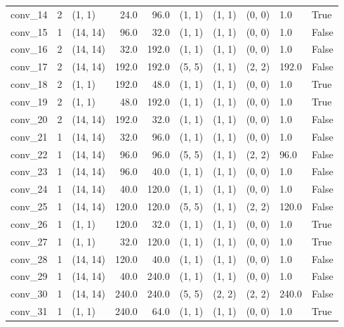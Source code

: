 \begin{center}
\begin{table}[]
\begin{tabular}{lrlrrlllll}
        conv\_14 &      2 &      (1, 1) &   24.0 &    96.0 &  (1, 1) &  (1, 1) &  (0, 0) &    1.0 &   True \\
        conv\_15 &      1 &    (14, 14) &   96.0 &    32.0 &  (1, 1) &  (1, 1) &  (0, 0) &    1.0 &  False \\
        conv\_16 &      2 &    (14, 14) &   32.0 &   192.0 &  (1, 1) &  (1, 1) &  (0, 0) &    1.0 &  False \\
        conv\_17 &      2 &    (14, 14) &  192.0 &   192.0 &  (5, 5) &  (1, 1) &  (2, 2) &  192.0 &  False \\
        conv\_18 &      2 &      (1, 1) &  192.0 &    48.0 &  (1, 1) &  (1, 1) &  (0, 0) &    1.0 &   True \\
        conv\_19 &      2 &      (1, 1) &   48.0 &   192.0 &  (1, 1) &  (1, 1) &  (0, 0) &    1.0 &   True \\
        conv\_20 &      2 &    (14, 14) &  192.0 &    32.0 &  (1, 1) &  (1, 1) &  (0, 0) &    1.0 &  False \\
        conv\_21 &      1 &    (14, 14) &   32.0 &    96.0 &  (1, 1) &  (1, 1) &  (0, 0) &    1.0 &  False \\
        conv\_22 &      1 &    (14, 14) &   96.0 &    96.0 &  (5, 5) &  (1, 1) &  (2, 2) &   96.0 &  False \\
        conv\_23 &      1 &    (14, 14) &   96.0 &    40.0 &  (1, 1) &  (1, 1) &  (0, 0) &    1.0 &  False \\
        conv\_24 &      1 &    (14, 14) &   40.0 &   120.0 &  (1, 1) &  (1, 1) &  (0, 0) &    1.0 &  False \\
        conv\_25 &      1 &    (14, 14) &  120.0 &   120.0 &  (5, 5) &  (1, 1) &  (2, 2) &  120.0 &  False \\
        conv\_26 &      1 &      (1, 1) &  120.0 &    32.0 &  (1, 1) &  (1, 1) &  (0, 0) &    1.0 &   True \\
        conv\_27 &      1 &      (1, 1) &   32.0 &   120.0 &  (1, 1) &  (1, 1) &  (0, 0) &    1.0 &   True \\
        conv\_28 &      1 &    (14, 14) &  120.0 &    40.0 &  (1, 1) &  (1, 1) &  (0, 0) &    1.0 &  False \\
        conv\_29 &      1 &    (14, 14) &   40.0 &   240.0 &  (1, 1) &  (1, 1) &  (0, 0) &    1.0 &  False \\
        conv\_30 &      1 &    (14, 14) &  240.0 &   240.0 &  (5, 5) &  (2, 2) &  (2, 2) &  240.0 &  False \\
        conv\_31 &      1 &      (1, 1) &  240.0 &    64.0 &  (1, 1) &  (1, 1) &  (0, 0) &    1.0 &   True \\

\end{tabular}
\end{table}
\end{center}
